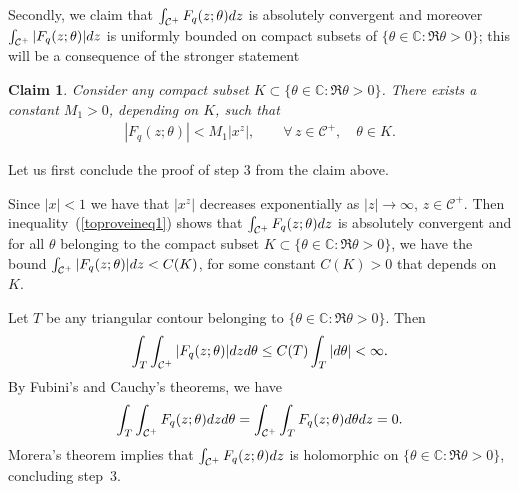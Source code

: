 \documentclass[11pt]{article}
\numberwithin{equation}{section}
\newtheorem{claim}[thm]{Claim}
\newcommand{\C}{\mathbb{C}}
\newcommand{\CC}{\mathcal{C}}
\begin{document}
Secondly, we claim that $\int_{\CC^+}{F_q(z; \theta){\rm d}z}$ is absolutely convergent and moreover $\int_{\CC^+}{|F_q(z; \theta)|{\rm d}z}$ is uniformly bounded on compact subsets of $\{\theta\in\C\colon \Re\theta > 0\}$; this will be a consequence of the stronger statement

\begin{claim}\label{bound1}
Consider any compact subset $K\subset\{\theta\in\C\colon \Re\theta > 0\}$. There exists a constant $M_1> 0$, depending on $K$, such that
\begin{gather}\label{toproveineq1}
|F_q(z; \theta)| < M_1 |x^z|, \qquad \forall\, z\in\CC^+,\quad \theta\in K.
\end{gather}
\end{claim}

Let us f\/irst conclude the proof of step 3 from the claim above.

Since $|x| < 1$ we have that $|x^z|$ decreases exponentially as $|z|\rightarrow\infty$, $z\in\CC^+$. Then inequality~(\ref{toproveineq1}) shows that $\int_{\CC^+}{F_q(z; \theta){\rm d}z}$ is absolutely convergent and for all $\theta$ belonging to the compact subset $K\subset\{\theta\in\C\colon \Re\theta > 0\}$, we have the bound $\int_{\CC^+}{|F_q(z; \theta)|{\rm d}z} < C(K)$, for some constant $C(K) > 0$ that depends on~$K$.

Let $T$ be any triangular contour belonging to $\{\theta\in\C\colon \Re\theta > 0\}$. Then
\begin{gather*}
\int_T{\int_{\CC^+}{|F_q(z; \theta)|{\rm d}z}{\rm d}\theta} \leq C(T)\int_T{|{\rm d}\theta|} < \infty.
 \end{gather*}
 By Fubini's and Cauchy's theorems, we have \begin{gather*}
 \int_T{\int_{\CC^+}{F_q(z; \theta){\rm d}z}{\rm d}\theta} = \int_{\CC^+}\int_{T}{{F_q(z; \theta){\rm d}\theta}{\rm d}z} = 0.
 \end{gather*}
Morera's theorem implies that $\int_{\CC^+}{F_q(z; \theta){\rm d}z}$ is holomorphic on $\{\theta\in\C\colon \Re\theta > 0\}$, concluding step~3.
\end{document}
